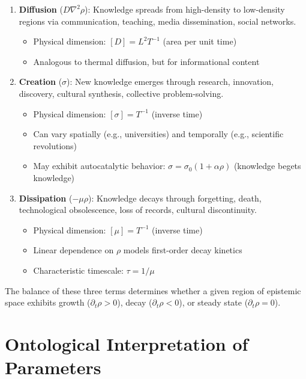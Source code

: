 \documentclass[12pt]{article}
\begin{document}
\begin{enumerate}
    \item \textbf{Diffusion} ($D\nabla^2\rho$): Knowledge spreads from high-density to low-density regions via communication, teaching, media dissemination, social networks.
    \begin{itemize}
        \item Physical dimension: $[D] = L^2T^{-1}$ (area per unit time)
        \item Analogous to thermal diffusion, but for informational content
    \end{itemize}
    
    \item \textbf{Creation} ($\sigma$): New knowledge emerges through research, innovation, discovery, cultural synthesis, collective problem-solving.
    \begin{itemize}
        \item Physical dimension: $[\sigma] = T^{-1}$ (inverse time)
        \item Can vary spatially (e.g., universities) and temporally (e.g., scientific revolutions)
        \item May exhibit autocatalytic behavior: $\sigma = \sigma_0(1 + \alpha\rho)$ (knowledge begets knowledge)
    \end{itemize}
    
    \item \textbf{Dissipation} ($-\mu\rho$): Knowledge decays through forgetting, death, technological obsolescence, loss of records, cultural discontinuity.
    \begin{itemize}
        \item Physical dimension: $[\mu] = T^{-1}$ (inverse time)
        \item Linear dependence on $\rho$ models first-order decay kinetics
        \item Characteristic timescale: $\tau = 1/\mu$
    \end{itemize}
\end{enumerate}

The balance of these three terms determines whether a given region of epistemic space exhibits growth ($\partial_t\rho > 0$), decay ($\partial_t\rho < 0$), or steady state ($\partial_t\rho = 0$).

\section{Ontological Interpretation of Parameters}
\end{document}
